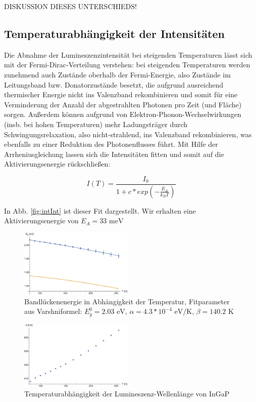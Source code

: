 \documentclass[aps,twocolumn,secnumarabic,nobalancelastpage,amsmath,amssymb,
nofootinbib,superscriptaddress]{revtex4-1}
\begin{document}
DISKUSSION DIESES UNTERSCHIEDS!


\subsection{Temperaturabhängigkeit der Intensitäten}


\noindent Die Abnahme der Lumineszenzintensität bei steigenden Temperaturen lässt sich mit der Fermi-Dirac-Verteilung
verstehen: bei steigenden Temperaturen werden zunehmend auch Zustände oberhalb der Fermi-Energie, also Zustände
im Leitungsband bzw. Donatorzustände besetzt, die aufgrund ausreichend thermischer Energie nicht ins Valenzband
rekombinieren und somit für eine Verminderung der Anzahl der abgestrahlten Photonen pro Zeit (und Fläche) sorgen.
Außerdem können aufgrund von Elektron-Phonon-Wechselwirkungen (insb. bei hohen Temperaturen) mehr Ladungsträger durch
Schwingungsrelaxation, also nicht-strahlend, ins Valenzband rekombinieren, was ebenfalls zu einer Reduktion des
Photonenflusses führt.
Mit Hilfe der Arrheniusgleichung lassen sich die Intensitäten fitten und somit auf
die Aktivierungsenergie rückschließen:

  \begin{equation}
    I(T) = \frac{I_0}{1+c*exp\left( -\frac{E_A}{k_B T} \right)}
  \end{equation}

 In Abb. \ref{fig:intInt} ist dieser Fit dargestellt.
Wir erhalten eine Aktivierungsenergie von $E_A=33 \text{ meV}$

\begin{figure}[t]
  \centering
  \includegraphics[width=0.48\textwidth]{../Messung/energtemp.eps}
  \caption{\label{fig:EgapT} Bandlückenenergie in Abhängigkeit der Temperatur, Fitparameter
  aus Varshniformel: $E_g^0= 2.03 \text{ eV}$, $ \alpha = 4.3*10^{-4} \text{ eV/K}$, \quad $ \beta = 140.2 \text{ K}$}
\end{figure}

\begin{figure}[b]
  \centering
  \includegraphics[width=0.48\textwidth]{../Messung/peaktemp.eps}
  \caption{\label{fig:lamT} Temperaturabhängigkeit der Lumineszenz-Wellenlänge von InGaP}
\end{figure}
\end{document}
